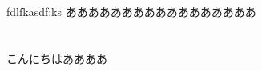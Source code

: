 \documentclass[dvipdfmx,report,11pt]{jsarticle}
\title{}
\author{funaki}
\date{\today}
\begin{document}
\newcommand{\ctext}[1]{\raise0.2ex\hbox{\textcircled{\scriptsize{#1}}}}
\maketitle

fdlfkasdf:ks
あああああああああああああああああ
\section{}
こんにちはああああ
\end{document}
